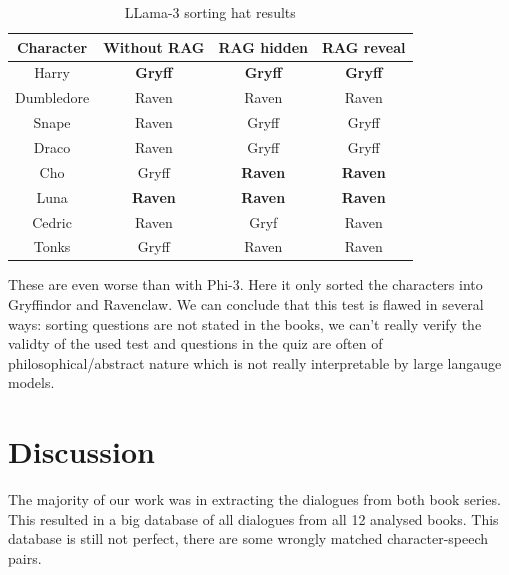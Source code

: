 \documentclass[fleqn,moreauthors,10pt]{ds_report}
\begin{document}
\begin{table}[hbt]
	\caption{LLama-3 sorting hat results}
	\centering
	\begin{tabular}{c | c | c | c }
		Character  & Without RAG    & RAG hidden     & RAG reveal     \\ \hline
		Harry      & \textbf{Gryff} & \textbf{Gryff} & \textbf{Gryff} \\
		Dumbledore & Raven          & Raven          & Raven          \\ \hline
		Snape      & Raven          & Gryff          & Gryff          \\
		Draco      & Raven          & Gryff          & Gryff          \\ \hline
		Cho        & Gryff          & \textbf{Raven} & \textbf{Raven} \\
		Luna       & \textbf{Raven} & \textbf{Raven} & \textbf{Raven} \\ \hline
		Cedric     & Raven          & Gryf           & Raven          \\
		Tonks      & Gryff          & Raven          & Raven          \\
	\end{tabular}
	\label{tab:sorting_hat_results_llama}
\end{table}

These are even worse than with Phi-3. Here it only sorted the characters into Gryffindor and Ravenclaw.
We can conclude that this test is flawed in several ways: sorting questions are not stated in the books,
we can't really verify the validty of the used test
and questions in the quiz are often of philosophical/abstract nature which is not really interpretable by large langauge models.


\section*{Discussion}

The majority of our work was in extracting the dialogues from both book series.
This resulted in a big database of all dialogues from all 12 analysed books.
This database is still not perfect, there are some wrongly matched character-speech pairs.



\end{document}
